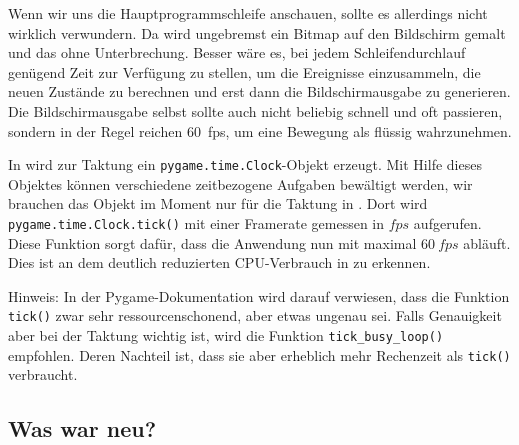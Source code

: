 
Wenn wir uns die Hauptprogrammschleife anschauen, sollte es allerdings nicht wirklich verwundern. Da wird ungebremst ein Bitmap auf den Bildschirm gemalt und das ohne Unterbrechung. Besser wäre es, bei jedem Schleifendurchlauf genügend Zeit zur Verfügung zu stellen, um die Ereignisse einzusammeln, die neuen Zustände zu berechnen und erst dann die Bildschirmausgabe zu generieren. Die Bildschirmausgabe selbst sollte auch nicht beliebig schnell und oft passieren, sondern in der Regel reichen 60~\gls{fps}, um eine Bewegung als flüssig wahrzunehmen. 


In  wird zur Taktung ein \texttt{pygame.time.Clock}-Objekt erzeugt. Mit Hilfe dieses Objektes können verschiedene zeitbezogene Aufgaben bewältigt werden, wir brauchen das Objekt im Moment nur für die Taktung in . Dort wird \texttt{pygame.time.Clock.\-tick()} mit einer Framerate gemessen in $fps$ aufgerufen. Diese Funktion sorgt dafür, dass die Anwendung nun mit maximal $60~fps$ abläuft. Dies ist an dem deutlich reduzierten CPU-Verbrauch in  zu erkennen.

Hinweis: In der Pygame-Dokumentation wird darauf verwiesen, dass die Funktion \texttt{tick()} zwar sehr ressourcenschonend, aber etwas ungenau sei. Falls Genauigkeit aber bei der Taktung wichtig ist, wird die Funktion \texttt{tick\_busy\_loop()} empfohlen. Deren Nachteil ist, dass sie aber erheblich mehr Rechenzeit als \texttt{tick()} verbraucht.


\newpage
\subsection*{Was war neu?}

